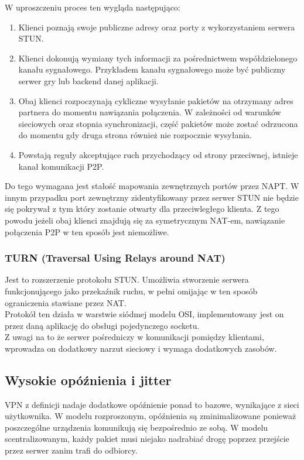 W uproszczeniu proces ten wygląda następująco:

\begin{enumerate}[leftmargin=*]
    \item Klienci poznają swoje publiczne adresy oraz porty z wykorzystaniem serwera STUN.
    \item Klienci dokonują wymiany tych informacji za pośrednictwem współdzielonego kanału sygnałowego. Przykładem kanału sygnałowego może być publiczny serwer gry lub backend danej aplikacji.
    \item Obaj klienci rozpoczynają cykliczne wysyłanie pakietów na otrzymany adres partnera do momentu nawiązania połączenia. W zależności od warunków sieciowych oraz stopnia synchronizacji, część pakietów może zostać odrzucona do momentu gdy druga strona również nie rozpocznie wysyłania.
    \item Powstają reguły akceptujące ruch przychodzący od strony przeciwnej, istnieje kanał komunikacji P2P.
\end{enumerate}

Do tego wymagana jest stałość mapowania zewnętrznych portów przez NAPT. W innym przypadku port zewnętrzny zidentyfikowany przez serwer STUN nie będzie się pokrywał z tym który zostanie otwarty dla przeciwległego klienta. Z tego powodu jeżeli obaj klienci znajdują się za symetrycznym NAT-em, nawiązanie połączenia P2P w ten sposób jest niemożliwe.\\

\subsubsection{TURN (Traversal Using Relays around NAT)}

Jest to rozszerzenie protokołu STUN. Umożliwia stworzenie serwera funkcjonującego jako przekaźnik ruchu, w pełni omijając w ten sposób ograniczenia stawiane przez NAT. \\

Protokół ten działa w warstwie siódmej modelu OSI, implementowany jest on przez daną aplikację do obsługi pojedynczego socketu.\\

Z uwagi na to że serwer pośredniczy w komunikacji pomiędzy klientami, wprowadza on dodatkowy narzut sieciowy i wymaga dodatkowych zasobów.

\newpage

\subsection{Wysokie opóźnienia i jitter}
VPN z definicji nadaje dodatkowe opóźnienie ponad to bazowe, wynikające z sieci użytkownika. W modelu rozproszonym, opóźnienia są zminimalizowane ponieważ poszczególne urządzenia komunikują się bezpośrednio ze sobą. W modelu scentralizowanym, każdy pakiet musi niejako nadrabiać drogę poprzez przejście przez serwer zanim trafi do odbiorcy.\\

